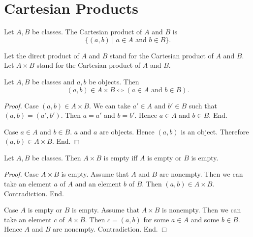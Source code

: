 \documentclass[10pt]{article}
\begin{document}
  \section{Cartesian Products}

  \begin{forthel}
    \begin{definition}
      Let $A, B$ be classes.
      The Cartesian product of $A$ and $B$ is
      \[ \{ (a, b) \mid \text{$a \in A$ and $b \in B$} \}. \]
    \end{definition}

    Let the direct product of $A$ and $B$ stand for  the Cartesian product of
    $A$ and $B$.
    Let $A \times B$ stand for the Cartesian product of $A$ and $B$.
  \end{forthel}

  \begin{forthel}
    \begin{proposition}
      Let $A, B$ be classes and $a, b$ be objects.
      Then \[ (a, b) \in A \times B \iff (\text{$a \in A$ and $b \in B$}). \]
    \end{proposition}
    \begin{proof}
      Case $(a, b) \in A \times B$.
        We can take $a' \in A$ and $b' \in B$ such that $(a, b) = (a', b')$.
        Then $a = a'$ and $b = b'$.
        Hence $a \in A$ and $b \in B$.
      End.

      Case $a \in A$ and $b \in B$.
        $a$ and $a$ are objects.
        Hence $(a, b)$ is an object.
        Therefore $(a, b) \in A \times B$.
      End.
    \end{proof}
  \end{forthel}

  \begin{forthel}
    \begin{proposition}
      Let $A, B$ be classes.
      Then $A \times B$ is empty iff $A$ is empty or $B$ is empty.
    \end{proposition}
    \begin{proof}
      Case $A \times B$ is empty.
        Assume that $A$ and $B$ are nonempty.
        Then we can take an element $a$ of $A$ and an element $b$ of $B$.
        Then $(a, b) \in A \times B$.
        Contradiction.
      End.

      Case $A$ is empty or $B$ is empty.
        Assume that $A \times B$ is nonempty.
        Then we can take an element $c$ of $A \times B$.
        Then $c = (a, b)$ for some $a \in A$ and some $b \in B$.
        Hence $A$ and $B$ are nonempty.
        Contradiction.
      End.
    \end{proof}
  \end{forthel}
\end{document}
